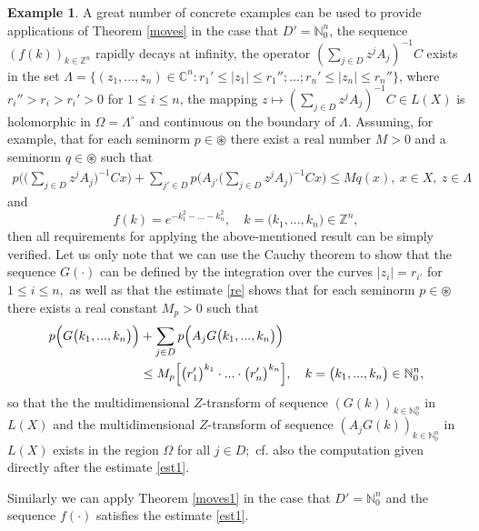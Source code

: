 \documentclass{amsart}
\theoremstyle{definition}
\newtheorem{example}[thm]{Example}
\theoremstyle{remark}
\numberwithin{equation}{section}
\begin{document}
\begin{example}\label{zan}
A great number of concrete examples can be used to provide applications of Theorem \ref{moves} in the case that $D'={\mathbb N}_{0}^{n}$, the sequence $(f(k))_{k\in {\mathbb Z}^{n}}$ rapidly decays at infinity, the operator $(\sum_{j\in D}z^{j}A_{j})^{-1}C$ exists in the set $\Lambda =\{(z_{1},...,z_{n})\in {\mathbb C}^{n}: r_{1}'\leq |z_{1}|\leq r_{1}'';...;r_{n}'\leq |z_{n}|\leq r_{n}''\}$, where $r_{i}''>r_{i}>r_{i}'>0$ for $1\leq i\leq n$, the mapping $z\mapsto (\sum_{j\in D}z^{j}A_{j})^{-1}C\in L(X)$ is holomorphic in $\Omega=\Lambda^{\circ}$ and continuous on the boundary of $\Lambda$. Assuming, for example, that for each seminorm $p\in \circledast$ there exist a real number $M>0$ and a seminorm $q\in \circledast$ such that 
\begin{align}\label{re}
p\Biggl(\Biggl(\sum_{j\in D}z^{j}A_{j}\Biggr)^{-1}Cx\Biggr)+\sum_{j'\in D}p\Biggl(A_{j'}\Biggl(\sum_{j\in D}z^{j}A_{j}\Biggr)^{-1}Cx\Biggr)\leq Mq(x),\ x\in X, \ z\in \Lambda
\end{align}
and   
$$
f(k)=e^{-k_{1}^{2}-...-k_{n}^{2}},\quad k=\bigl(k_{1},...,k_{n}\bigr)\in {\mathbb Z}^{n},
$$ 
then all requirements for applying the above-mentioned result can be simply verified. Let us only note that we can use the Cauchy theorem to show that the sequence $G(\cdot)$ can be defined by the integration over the curves $|z_i|=r_{i'}$ for $1\leq i\leq n,$ as well as that the  estimate \eqref{re} shows that for each seminorm $p\in \circledast$ there exists a real constant $M_{p}>0$ such that 
\begin{align*} 
p\Bigl(G\bigl(k_{1},...,k_{n}\bigr)\Bigr)& +\sum_{j\in D}p\Bigl(A_{j}G\bigl(k_{1},...,k_{n}\bigr)\Bigr)
\\& \leq M_{p}\Bigl[\bigl(r_{1}'\bigr)^{k_{1}}\cdot ... \cdot \bigl(r_{n}'\bigr)^{k_{n}}\Bigr],\quad k=\bigl(k_{1},...,k_{n}\bigr)\in {\mathbb N}_{0}^{n},
\end{align*}
so that the the multidimensional $Z$-transform of sequence $(G(k))_{k\in {\mathbb N}_{0}^{n}}$  in $L(X)$ and the multidimensional $Z$-transform of sequence $(A_{j}G(k))_{k\in {\mathbb N}_{0}^{n}}$ in $L(X)$ exists in the region $\Omega$ for all $j\in D;$ cf. also the computation given directly after the estimate \eqref{est1}.

Similarly we can apply Theorem \ref{moves1} in the case that $D'={\mathbb N}_{0}^{n}$ and the sequence $f(\cdot)$ satisfies the estimate \eqref{est1}.
\end{example}
\end{document}
